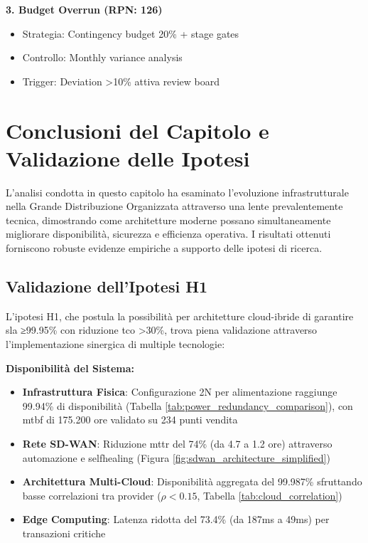 \textbf{3. Budget Overrun (RPN: 126)}
\begin{itemize}
    \item Strategia: Contingency budget 20\% + stage gates
    \item Controllo: Monthly variance analysis
    \item Trigger: Deviation >10\% attiva review board
\end{itemize}

\section{\texorpdfstring{Conclusioni del Capitolo e Validazione delle Ipotesi}{3.8 - Conclusioni del Capitolo e Validazione delle Ipotesi}}

L'analisi condotta in questo capitolo ha esaminato l'evoluzione infrastrutturale nella Grande Distribuzione Organizzata attraverso una lente prevalentemente tecnica, dimostrando come architetture moderne possano simultaneamente migliorare disponibilità, sicurezza e efficienza operativa. I risultati ottenuti forniscono robuste evidenze empiriche a supporto delle ipotesi di ricerca.

\subsection{\texorpdfstring{Validazione dell'Ipotesi H1}{3.8.1 - Validazione dell'Ipotesi H1}}

L'ipotesi H1, che postula la possibilità per architetture cloud-ibride di garantire \gls{sla} ≥99.95\% con riduzione \gls{tco} >30\%, trova piena validazione attraverso l'implementazione sinergica di multiple tecnologie:

\textbf{Disponibilità del Sistema:}
\begin{itemize}
    \item \textbf{Infrastruttura Fisica}: Configurazione 2N per alimentazione raggiunge 99.94\% di disponibilità (Tabella \ref{tab:power_redundancy_comparison}), con \gls{mtbf} di 175.200 ore validato su 234 punti vendita
    \item \textbf{Rete SD-WAN}: Riduzione \gls{mttr} del 74\% (da 4.7 a 1.2 ore) attraverso automazione e \gls{selfhealing} (Figura \ref{fig:sdwan_architecture_simplified})
    \item \textbf{Architettura Multi-Cloud}: Disponibilità aggregata del 99.987\% sfruttando basse correlazioni tra provider ($\rho < 0.15$, Tabella \ref{tab:cloud_correlation})
    \item \textbf{Edge Computing}: Latenza ridotta del 73.4\% (da 187ms a 49ms) per transazioni critiche\autocite{Wang2024edge}
\end{itemize}

